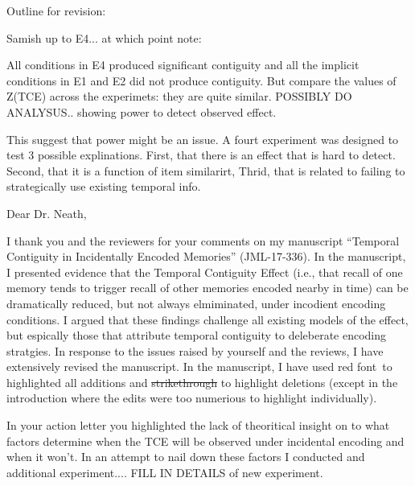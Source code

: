 \documentclass[12pt]{article}
\begin{document}



Outline for revision:

Samish up to E4... at which point note:

All conditions in E4 produced significant contiguity and all the implicit conditions in E1 and E2 did not produce contiguity. But compare the values of Z(TCE) across the experimets: they are quite similar. POSSIBLY DO ANALYSUS.. showing power to detect observed effect.

This suggest that power might be an issue. A fourt experiment was designed to test 3 possible explinations. First, that there is an effect that is hard to detect. Second, that it is a function of item similarirt, Thrid, that is related to failing to strategically use existing temporal info.




Dear Dr. Neath,
 

I thank you and the reviewers for your comments on my manuscript  ``Temporal Contiguity in Incidentally Encoded Memories'' (JML-17-336). In the manuscript, I presented evidence that the Temporal Contiguity Effect (i.e., that recall of one memory tends to trigger recall of other memories encoded nearby in time) can be dramatically reduced, but not always elmiminated, under incodient encoding conditions. I argued that these findings challenge all existing models of the effect, but espically those that attribute temporal contiguity to deleberate encoding stratgies. In response to the issues raised by yourself and the reviews, I have extensively revised the manuscript. In the manuscript, I have used  \color{red}red font\color{black}~to highlighted all additions and \st{strikethrough} to highlight deletions (except in the introduction where the edits were too numerious to highlight individually).


In your action letter you highlighted the lack of theoritical insight on to what factors determine when the TCE will be observed under incidental encoding and when it won't. In an attempt to nail down these factors I conducted and additional experiment.... FILL IN DETAILS of new experiment.
\end{document}
